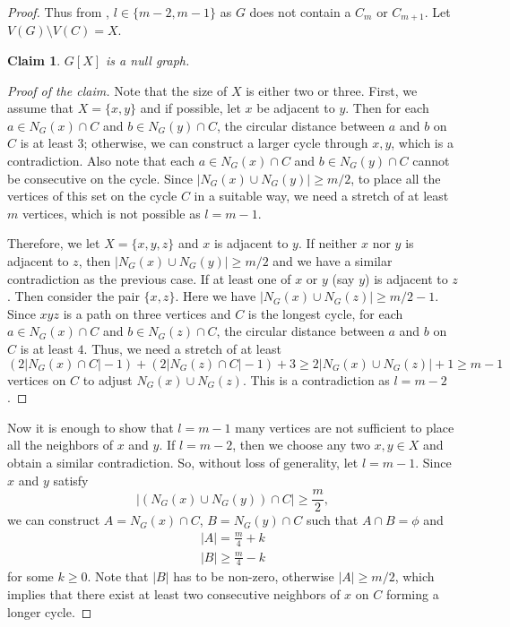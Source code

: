 \documentclass[12pt]{article}
\newtheorem{claim}{Claim}
\theoremstyle{definition}
\begin{document}
\begin{proof}
Thus from , $l\in \{m-2,m-1\}$ as ${G}$ does not contain a $C_{m}$ or $C_{m+1}$. Let $V(G)\setminus V(C)=X$.
 \begin{claim}
        $G[X]$ is a null graph.
    \end{claim}
\begin{proof}[Proof of the claim]
Note that the size of $X$ is either two or three. First, we assume that $X=\{x,y\}$ and if possible, let $x$ be adjacent to $y$. Then for each $a\in N_G(x)\cap C$ and $b\in N_G(y)\cap C$, the circular distance between $a$ and $b$ on $C$ is at least $3$; otherwise, we can construct a larger cycle through $x,y$, which is a contradiction. Also note that each $a\in  N_G(x)\cap C$ and $b\in  N_G(y)\cap C$ cannot be consecutive on the cycle. Since $|N_G(x)\cup N_G(y)|\geq m/2$, to place all the vertices of this set on the cycle $C$ in a suitable way, we need a stretch of at least $m$ vertices, which is not possible as $l=m-1$.

Therefore, we let $X=\{x,y,z\}$ and $x$ is adjacent to $y$. If neither $x$ nor $y$ is adjacent to $z$, then $|N_G(x)\cup N_G(y)|\geq m/2$ and we have a similar contradiction as the previous case. If at least one of $x$ or $y$ (say $y$) is adjacent to $z$. Then consider the pair $\{x,z\}$. Here we have $|N_G(x)\cup N_G(z)|\geq m/2-1$. Since $xyz$ is a path on three vertices and $C$ is the longest cycle, for each $a\in N_G(x)\cap C$ and $b\in N_G(z)\cap C$, the circular distance between $a$ and $b$ on $C$ is at least $4$. Thus, we need a stretch of at least 
\begin{equation*}
    (2|N_G(x)\cap C|-1)+(2|N_G(z)\cap C|-1)+3\geq 2|N_G(x)\cup N_G(z)|+1\geq m-1
\end{equation*}
vertices on $C$ to adjust $N_G(x)\cup N_G(z)$. This is a contradiction as $l=m-2$.
\end{proof}

Now it is enough to show that $l=m-1$ many vertices are not sufficient to place all the neighbors of $x$ and $y$. If $l=m-2$, then we choose any two $x,y\in X$ and obtain a similar contradiction. So, without loss of generality, let $l=m-1$. Since $x$ and $y$ satisfy
    \begin{equation}
        |(N_{G}(x)\cup N_{G}(y))\cap C|\geq \frac{m}{2},
    \end{equation}
    we can construct $A=N_G(x) \cap C$, $B=N_G(y) \cap C$ such that $A\cap B= \phi$ and
    \begin{align*}
        |A|=\frac{m}{4}+k\\
        |B|\geq \frac{m}{4}-k
    \end{align*}
    for some $k\geq 0$. Note that $|B|$ has to be non-zero, otherwise $|A|\geq m/2$, which implies that there exist at least two consecutive neighbors of $x$ on $C$ forming a longer cycle.




\end{proof}
\end{document}
